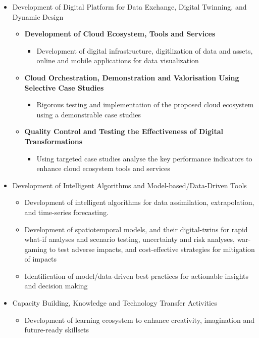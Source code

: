 \documentclass{ammTalk}
\begin{document}
\begin{itemize}[itemsep=5mm]\LARGE
 \item Development of Digital Platform for Data Exchange, Digital Twinning, and Dynamic Design
       \begin{itemize}[itemsep=5mm]\Large
        \item \textbf{Development of Cloud Ecosystem, Tools and Services}
              \begin{itemize}
               \item Development of digital infrastructure, digitlization of data and assets, online and mobile applications for data visualization
              \end{itemize}

        \item \textbf{Cloud Orchestration, Demonstration and Valorisation Using Selective Case Studies}
              \begin{itemize}
               \item Rigorous testing and implementation of the proposed cloud ecosystem using a demonstrable case studies
              \end{itemize}

        \item \textbf{Quality Control and Testing the Effectiveness of Digital Transformations}
            \begin{itemize}
                \item Using targeted case studies analyse the key performance indicators to enhance cloud ecosystem tools and services
            \end{itemize}
       \end{itemize}
 \item Development of Intelligent Algorithms and Model-based/Data-Driven Tools
       \begin{itemize} \Large
        \item Development of intelligent algorithms for data assimilation, extrapolation, and time-series forecasting.
        \item Development of spatiotemporal models, and their digital-twins for rapid what-if analyses and scenario testing, uncertainty and risk analyses, war-gaming to test adverse impacts, and cost-effective strategies for mitigation of impacts
        \item Identification of model/data-driven best practices for actionable insights and decision making
       \end{itemize}
 \item Capacity Building, Knowledge and Technology Transfer Activities
       \begin{itemize} \Large
        \item Development of learning ecosystem to enhance creativity, imagination and future-ready skillsets
       \end{itemize}
\end{itemize}
\end{document}
